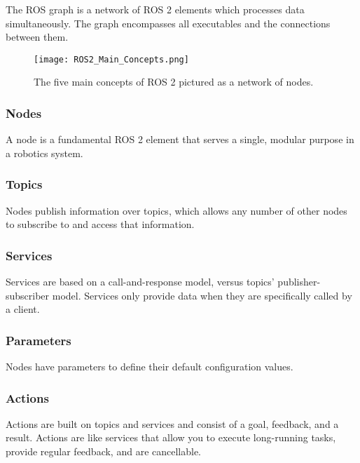 The ROS graph is a network of ROS 2 elements which processes data simultaneously. The graph encompasses all executables and the connections between them.

\begin{figure}[H]
    \centering
    \texttt{[image: ROS2\_Main\_Concepts.png]}
    \caption{The five main concepts of ROS 2 pictured as a network of nodes.}
    \label{fig:ROS 2 main concepts}
\end{figure}

\subsubsection{Nodes} \label{sec:ROS Nodes}
A node is a fundamental ROS 2 element that serves a single, modular purpose in a robotics system. \cite{ros2_documentation}

\subsubsection{Topics} \label{sec:ROS Topics}
Nodes publish information over topics, which allows any number of other nodes to subscribe to and access that information. \cite{ros2_documentation}

\subsubsection{Services} \label{sec:ROS Services}
Services are based on a call-and-response model, versus topics’ publisher-subscriber model. Services only provide data when they are specifically called by a client. \cite{ros2_documentation}

\subsubsection{Parameters} \label{sec:ROS Parameters}
Nodes have parameters to define their default configuration values. \cite{ros2_documentation}

\subsubsection{Actions} \label{sec:ROS Actions}
Actions are built on topics and services and consist of a goal, feedback, and a result. Actions are like services that allow you to execute long-running tasks, provide regular feedback, and are cancellable. \cite{ros2_documentation}
